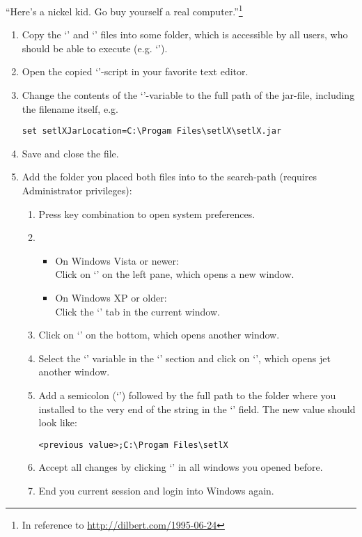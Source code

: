 \begin{center}
\large
``Here's a nickel kid. Go buy yourself a real computer.''\footnote{In reference to \url{http://dilbert.com/1995-06-24}}
\end{center}

\begin{enumerate}
	\item Copy the `' and `' files into some folder, which is accessible by all users, who should be able to execute \setlX{} (e.g. `').
	\item Open the copied `'-script in your favorite text editor.
	\item Change the contents of the `'-variable to the full path of the jar-file, including the filename itself, e.g.
\begin{lstlisting}[frame=none,numbers=none]
set setlXJarLocation=C:\Progam Files\setlX\setlX.jar
\end{lstlisting}
	\item Save and close the file.
	\item Add the folder you placed both files into to the search-path (requires Administrator privileges):
	\begin{enumerate}
		\item Press \command{[Win]+[Pause]} key combination to open system preferences.
		\item 
		\begin{itemize}
			\item On Windows Vista or newer:\\Click on `' on the left pane, which opens a new window.
			\item On Windows XP or older:\\Click the `' tab in the current window.
		\end{itemize}
		\item Click on `' on the bottom, which opens another window.
		\item Select the `' variable in the `' section and click on `', which opens jet another window.
		\item Add a semicolon (`\command{;}') followed by the full path to the folder where you installed \setlX{} to the very end of the string in the `' field. The new value should look like:
\begin{lstlisting}[frame=none,numbers=none]
<previous value>;C:\Progam Files\setlX
\end{lstlisting}
		\item Accept all changes by clicking `' in all windows you opened before.
		\item End you current session and login into Windows again.
	\end{enumerate}
\end{enumerate}

